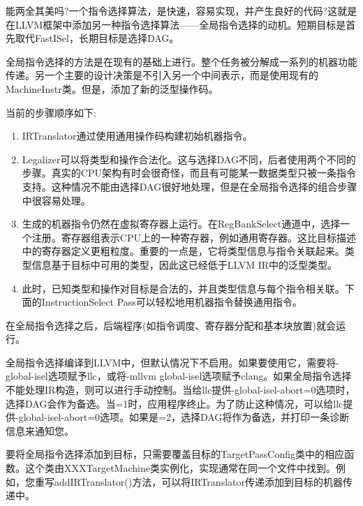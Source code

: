 能两全其美吗?一个指令选择算法，是快速，容易实现，并产生良好的代码?这就是在LLVM框架中添加另一种指令选择算法——全局指令选择的动机。短期目标是首先取代FastISel，长期目标是选择DAG。\par

全局指令选择的方法是在现有的基础上进行。整个任务被分解成一系列的机器功能传递。另一个主要的设计决策是不引入另一个中间表示，而是使用现有的MachineInstr类。但是，添加了新的泛型操作码。\par

当前的步骤顺序如下:\par

\begin{enumerate}
\item IRTranslator通过使用通用操作码构建初始机器指令。

\item Legalizer可以将类型和操作合法化。这与选择DAG不同，后者使用两个不同的步骤。真实的CPU架构有时会很奇怪，而且有可能某一数据类型只被一条指令支持。这种情况不能由选择DAG很好地处理，但是在全局指令选择的组合步骤中很容易处理。

\item 生成的机器指令仍然在虚拟寄存器上运行。在RegBankSelect通道中，选择一个注册。寄存器组表示CPU上的一种寄存器，例如通用寄存器。这比目标描述中的寄存器定义更粗粒度。重要的一点是，它将类型信息与指令关联起来。类型信息基于目标中可用的类型，因此这已经低于LLVM IR中的泛型类型。

\item 此时，已知类型和操作对目标是合法的，并且类型信息与每个指令相关联。下面的InstructionSelect Pass可以轻松地用机器指令替换通用指令。
\end{enumerate}

在全局指令选择之后，后端程序(如指令调度、寄存器分配和基本块放置)就会运行。\par

全局指令选择编译到LLVM中，但默认情况下不启用。如果要使用它，需要将-global-isel选项赋予llc，或将-mllvm global-isel选项赋予clang。如果全局指令选择不能处理IR构造，则可以进行手动控制。当给llc提供-global-isel-abort=0选项时，选择DAG会作为备选。当=1时，应用程序终止。为了防止这种情况，可以给llc提供-global-isel-abort=0选项。如果是=2，选择DAG将作为备选，并打印一条诊断信息来通知您。\par

要将全局指令选择添加到目标，只需要覆盖目标的TargetPassConfig类中的相应函数。这个类由XXXTargetMachine类实例化，实现通常在同一个文件中找到。例如，您重写addIRTranslator()方法，可以将IRTranslator传递添加到目标的机器传递中。\par

